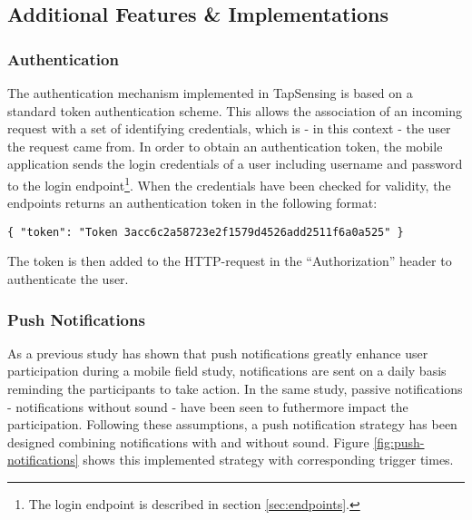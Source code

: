 \subsection{Additional Features \& Implementations}
\subsubsection{Authentication}
The authentication mechanism implemented in TapSensing is based on a standard token authentication scheme. This allows the association of an incoming request with a set of identifying credentials, which is - in this context - the user the request came from. In order to obtain an authentication token, the mobile application sends the login credentials of a user including username and password to the login endpoint\footnote{The login endpoint is described in section \ref{sec:endpoints}.}. When the credentials have been checked for validity, the endpoints returns an authentication token in the following format:
\begin{verbatim}
{ "token": "Token 3acc6c2a58723e2f1579d4526add2511f6a0a525" }
\end{verbatim}
The token is then added to the HTTP-request in the ``Authorization'' header to authenticate the user.

\subsubsection{Push Notifications}
As a previous study has shown that push notifications greatly enhance user participation \cite{pushNot} during a mobile field study, notifications are sent on a daily basis reminding the participants to take action. In the same study\cite{pushNot}, passive notifications - notifications without sound - have been seen to futhermore impact the participation. Following these assumptions, a push notification strategy has been designed combining notifications with and without sound. Figure \ref{fig:push-notifications} shows this implemented strategy with corresponding trigger times.

